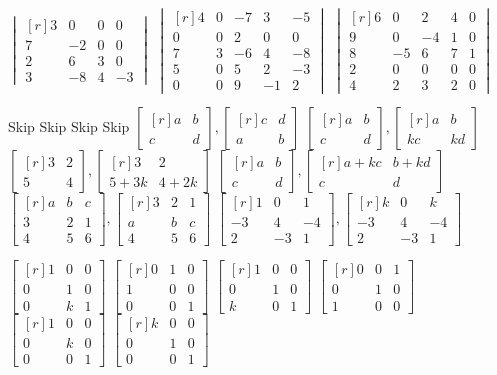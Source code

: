\documentclass[11pt,answers]{exam} %
\newcommand{\mat}[1]{\begin{bmatrix*}[r] #1 \end{bmatrix*}}
\newcommand{\dett}[1]{\begin{vmatrix*}[r] #1 \end{vmatrix*}}
\begin{document}
\begin{questions}
    \question $\dett{3 & 0 & 0 & 0 \\ 7 & -2 & 0 & 0 \\ 2 & 6 & 3 & 0 \\ 3 & -8 & 4 & -3}$
    \question $\dett{4 & 0 & -7 & 3 & -5 \\ 0 & 0 & 2 & 0 & 0 \\ 7 & 3 & -6 & 4 & -8 \\ 5 & 0 & 5 & 2 & -3 \\ 0 & 0 & 9 & -1 & 2}$
    \question $\dett{6 & 0 & 2 & 4 & 0 \\ 9 & 0 & -4 & 1 & 0 \\ 8 & -5 & 6 & 7 & 1 \\ 2 & 0 & 0 & 0 & 0 \\ 4 & 2 & 3 & 2 & 0}$

    \question Skip
    \question Skip
    \question Skip
    \question Skip
    \question $\mat{a & b \\ c & d}, \mat{c & d \\ a & b}$
    \question $\mat{a & b \\ c & d}, \mat{a & b \\ kc & kd}$
    \question $\mat{3 & 2 \\ 5 & 4}, \mat{3 & 2 \\ 5+3k & 4 + 2k}$
    \question $\mat{a & b \\ c & d}, \mat{a+kc & b+kd \\ c & d}$
    \question $\mat{a & b & c \\ 3 & 2 & 1 \\ 4 & 5 & 6}, \mat{3 & 2 & 1 \\ a & b & c \\ 4 & 5 & 6}$
    \question $\mat{1 & 0 & 1 \\ -3 & 4 & -4 \\ 2 & -3 & 1}, \mat{k & 0 & k \\ -3 & 4 & -4 \\ 2 & -3 & 1}$

    \question $\mat{1 & 0 & 0 \\ 0 & 1 & 0 \\ 0 & k & 1}$
    \question $\mat{0 & 1 & 0 \\ 1 & 0 & 0 \\ 0 & 0 & 1}$
    \question $\mat{1 & 0 & 0 \\ 0 & 1 & 0 \\ k & 0 & 1}$
    \question $\mat{0 & 0 & 1 \\ 0 & 1 & 0 \\ 1 & 0 & 0}$
    \question $\mat{1 & 0 & 0 \\ 0 & k & 0 \\ 0 & 0 & 1}$
    \question $\mat{k& 0 & 0 \\ 0 & 1 & 0 \\ 0 & 0 & 1}$


\end{questions}
\end{document}
